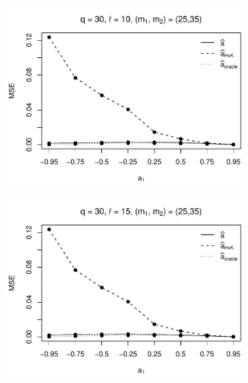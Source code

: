 \begin{figure}[p]
\begin{subfigure}[b]{0.45\textwidth}
\includegraphics[width=\textwidth]{Plots/Robustness/MSE_a1_T=500_slope=10_(q,r,M1,M2)=(30,10,25,35).pdf}
\end{subfigure}
\hspace{0.25cm}
\begin{subfigure}[b]{0.45\textwidth}
\includegraphics[width=\textwidth]{Plots/Robustness/MSE_a1_T=500_slope=10_(q,r,M1,M2)=(30,15,25,35).pdf}
\end{subfigure}


\end{figure}
